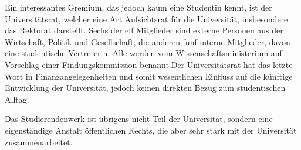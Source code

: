 Ein interessantes Gremium, das jedoch kaum eine Studentin kennt, ist der Universitätsrat, welcher eine Art Aufsichtsrat für die Universität, insbesondere das Rektorat darstellt. Sechs der elf Mitglieder sind externe Personen aus der Wirtschaft, Politik und Gesellschaft, die anderen fünf interne Mitglieder, davon eine studentische Vertreterin. Alle werden vom Wissenschaftsministerium auf Vorschlag einer Findungskommission benannt.Der Universitätsrat hat das letzte Wort in Finanzangelegenheiten und somit wesentlichen Einfluss auf die künftige Entwicklung der Universität, jedoch keinen direkten Bezug zum studentischen Alltag.



Das Studierendenwerk ist übrigens nicht Teil der Universität, sondern eine eigenständige Anstalt öffentlichen Rechts, die aber sehr stark mit der Universität zusammenarbeitet.

\vspace{-2mm}
